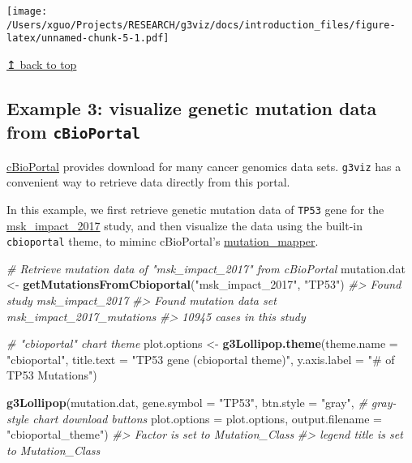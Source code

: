 \documentclass[
]{article}
\newenvironment{Shaded}{\begin{snugshade}}{\end{snugshade}}
\newcommand{\AttributeTok}[1]{\textcolor[rgb]{0.13,0.29,0.53}{#1}}
\newcommand{\CommentTok}[1]{\textcolor[rgb]{0.56,0.35,0.01}{\textit{#1}}}
\newcommand{\FunctionTok}[1]{\textcolor[rgb]{0.13,0.29,0.53}{\textbf{#1}}}
\newcommand{\NormalTok}[1]{#1}
\newcommand{\OtherTok}[1]{\textcolor[rgb]{0.56,0.35,0.01}{#1}}
\newcommand{\StringTok}[1]{\textcolor[rgb]{0.31,0.60,0.02}{#1}}
\begin{document}
\texttt{[image: /Users/xguo/Projects/RESEARCH/g3viz/docs/introduction\_files/figure-latex/unnamed-chunk-5-1.pdf]}

\hyperref[top]{↥ back to top}

\subsection{\texorpdfstring{Example 3: visualize genetic mutation data
from
\texttt{cBioPortal}}{Example 3: visualize genetic mutation data from cBioPortal}}\label{example-3-visualize-genetic-mutation-data-from-cbioportal}

\href{http://www.cbioportal.org/}{cBioPortal} provides download for many
cancer genomics data sets. \texttt{g3viz} has a convenient way to
retrieve data directly from this portal.

In this example, we first retrieve genetic mutation data of
\texttt{TP53} gene for the
\href{https://pubmed.ncbi.nlm.nih.gov/28481359/}{msk\_impact\_2017}
study, and then visualize the data using the built-in
\texttt{cbioportal} theme, to miminc cBioPortal's
\href{https://www.cbioportal.org/mutation_mapper}{mutation\_mapper}.

\begin{Shaded}
\begin{Highlighting}[]
\CommentTok{\# Retrieve mutation data of "msk\_impact\_2017" from cBioPortal}
\NormalTok{mutation.dat }\OtherTok{\textless{}{-}} \FunctionTok{getMutationsFromCbioportal}\NormalTok{(}\StringTok{"msk\_impact\_2017"}\NormalTok{, }\StringTok{"TP53"}\NormalTok{)}
\CommentTok{\#\textgreater{} Found study msk\_impact\_2017}
\CommentTok{\#\textgreater{} Found mutation data set msk\_impact\_2017\_mutations}
\CommentTok{\#\textgreater{} 10945 cases in this study}
\end{Highlighting}
\end{Shaded}

\begin{Shaded}
\begin{Highlighting}[]

\CommentTok{\# "cbioportal" chart theme}
\NormalTok{plot.options }\OtherTok{\textless{}{-}} \FunctionTok{g3Lollipop.theme}\NormalTok{(}\AttributeTok{theme.name =} \StringTok{"cbioportal"}\NormalTok{,}
                                 \AttributeTok{title.text =} \StringTok{"TP53 gene (cbioportal theme)"}\NormalTok{,}
                                 \AttributeTok{y.axis.label =} \StringTok{"\# of TP53 Mutations"}\NormalTok{)}

\FunctionTok{g3Lollipop}\NormalTok{(mutation.dat,}
           \AttributeTok{gene.symbol =} \StringTok{"TP53"}\NormalTok{,}
           \AttributeTok{btn.style =} \StringTok{"gray"}\NormalTok{, }\CommentTok{\# gray{-}style chart download buttons}
           \AttributeTok{plot.options =}\NormalTok{ plot.options,}
           \AttributeTok{output.filename =} \StringTok{"cbioportal\_theme"}\NormalTok{)}
\CommentTok{\#\textgreater{} Factor is set to Mutation\_Class}
\CommentTok{\#\textgreater{} legend title is set to Mutation\_Class}
\end{Highlighting}
\end{Shaded}
\end{document}
